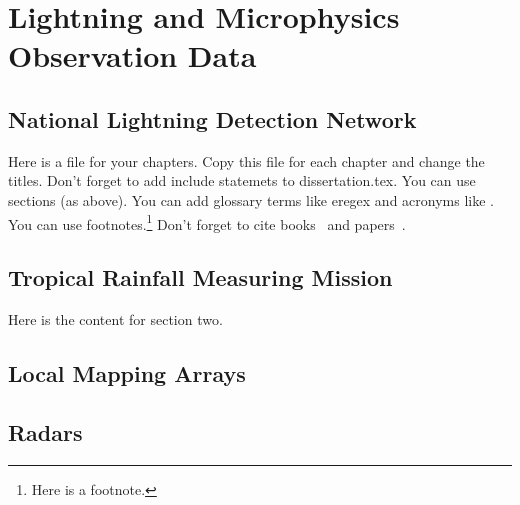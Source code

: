  
\chapter{Lightning and Microphysics Observation Data}
\resetfootnote %

\section{National Lightning Detection Network}

Here is a file for your chapters.  Copy this file for each chapter 
and change the titles.  Don't forget to add include statemets to 
dissertation.tex.  
You can use sections (as above).  
You can add glossary terms like \gls{eregex} and acronyms like .
You can use footnotes.\footnote{Here is a footnote.}
Don't forget to cite books~\cite{Sipser} and papers~\cite{CarleNarendran}.

\section{Tropical Rainfall Measuring Mission}

Here is the content for section two.

\section{Local Mapping Arrays}


\section{Radars}
